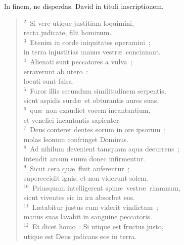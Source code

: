 \lettrine[lines=3,image=true,loversize=0.05,lraise=-0.03]{I}{}n finem, ne disperdas. David in tituli inscriptionem.
\begin{flushleft}\begin{verse}\vspace{6pt}${}^{2}$~Si vere utique justitiam loquimini,\\ recta judicate, filii hominum.\\
${}^{3}$~Etenim in corde iniquitates operamini~;\\ in terra injustitias manus vestr\ae\ concinnant.\\
${}^{4}$~Alienati sunt peccatores a vulva~;\\ erraverunt ab utero~:\\ locuti sunt falsa.\\
${}^{5}$~Furor illis secundum similitudinem serpentis,\\ sicut aspidis surd\ae\ et obturantis aures suas,\\
${}^{6}$~qu\ae\ non exaudiet vocem incantantium,\\ et venefici incantantis sapienter.\\
${}^{7}$~Deus conteret dentes eorum in ore ipsorum~;\\ molas leonum confringet Dominus.\\
${}^{8}$~Ad nihilum devenient tamquam aqua decurrens~;\\ intendit arcum suum donec infirmentur.\\
${}^{9}$~Sicut cera qu\ae\ fluit auferentur~;\\ supercecidit ignis, et non viderunt solem.\\
${}^{10}$~Priusquam intelligerent spin\ae\ vestr\ae\ rhamnum,\\ sicut viventes sic in ira absorbet eos.\\
${}^{11}$~L\ae tabitur justus cum viderit vindictam~;\\ manus suas lavabit in sanguine peccatoris.\\
${}^{12}$~Et dicet homo~: Si utique est fructus justo,\\ utique est Deus judicans eos in terra.\end{verse}\end{flushleft}



